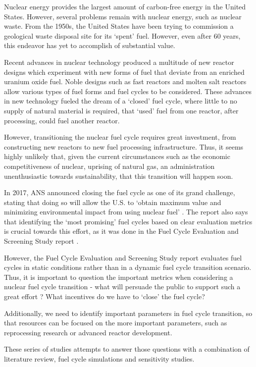 Nuclear energy provides the largest amount of carbon-free energy
in the United States. However, several problems remain with nuclear
energy, such as nuclear waste.
From the 1950s, the United States have been trying to commission a
geological waste disposal site for its `spent' fuel. However, even
after 60 years, this endeavor has yet to accomplish of substantial value.

Recent advances in nuclear technology produced
a multitude of new reactor designs which experiment with new forms
of fuel that deviate from an enriched uranium oxide fuel.
Noble designs such as fast reactors and molten salt reactors
allow various types of fuel forms and fuel cycles to be considered. These advances in new
technology fueled the dream of a `closed' fuel cycle, where little to no
supply of natural material is required, that `used' fuel from one reactor,
after processing, could fuel another reactor.

However, transitioning the nuclear fuel cycle requires great investment,
from constructing new reactors to new fuel processing infrastructure.
Thus, it seems highly unlikely that, given the current circumstances
such as the economic competitiveness of nuclear, uprising of natural
gas, an administration unenthusiastic towards sustainability, that
this transition will happen soon.

In 2017, \gls{ANS} announced closing the fuel cycle as one of its
grand challenge, stating that doing so will allow the U.S.
to `obtain maximum value and minimizing environmental
impact from using nuclear fuel' \cite{_ans_2017}.
The report also says that identifying the `most promising'
fuel cycles based on clear evaluation metrics is crucial towards
this effort, as it was done in the Fuel Cycle Evaluation and Screening
Study report \cite{wigeland_nuclear_2014}.

However, the Fuel Cycle Evaluation and Screening Study report
evaluates fuel cycles in static conditions rather than
in a dynamic fuel cycle transition scenario.
Thus, it is important to question the important metrics when considering
a nuclear fuel cycle transition - what will persuade
the public to support such a great effort ? What incentives
do we have to `close' the fuel cycle?

Additionally, we need to identify important parameters in
fuel cycle transition, so that resources can be
focused on the more important parameters, such as reprocessing
research or advanced reactor development.

These series of studies attempts to answer those questions with a
combination of literature review, fuel cycle simulations and sensitivity
studies.
